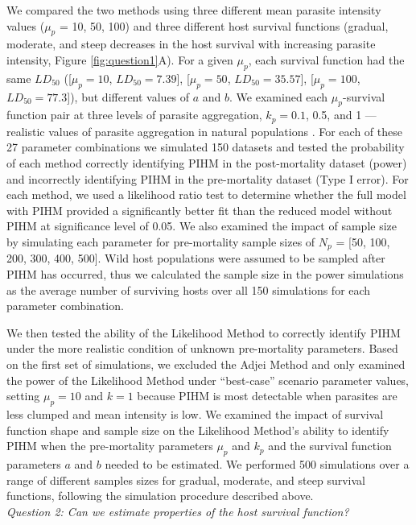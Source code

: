 \documentclass[12pt, a4paper]{article}
\begin{document}
We compared the two methods using three different mean parasite intensity values ($\mu_p$ = 10, 50, 100) and three different host survival functions (gradual, moderate, and steep decreases in the host survival with increasing parasite intensity, Figure \ref{fig:question1}A). For a given $\mu_p$, each survival function had the same $LD_{50}$ ([$\mu_p = 10$, $LD_{50} = 7.39$], [$\mu_p = 50$, $LD_{50} = 35.57$], [$\mu_p = 100$, $LD_{50}= 77.3$]),  but different values of $a$ and $b$.  We examined each $\mu_p$-survival function pair at  three levels of parasite
aggregation, $k_p = 0.1$, 0.5, and 1 --- realistic values of parasite aggregation in natural populations \citep{Shaw1998}.  For each of these 27 parameter
combinations we simulated 150 datasets and tested the probability of each method correctly identifying PIHM in the post-mortality dataset (power) and incorrectly identifying PIHM in the pre-mortality dataset (Type I error).  For each method, we used a likelihood ratio test to determine whether the full model with PIHM provided a significantly better fit than the reduced model without PIHM at significance level of 0.05.  We also examined the impact of sample size by simulating each parameter for pre-mortality sample sizes of $N_p$ = [50, 100, 200, 300, 400, 500].  Wild host populations were assumed to be sampled after PIHM has occurred, thus we calculated the sample size in the power simulations as the average number of surviving hosts over all 150 simulations for each parameter combination.

We then tested the ability of the Likelihood Method to correctly identify PIHM
under the more realistic condition of unknown pre-mortality parameters. Based
on the first set of simulations, we excluded the Adjei Method and only examined
the power of the Likelihood Method under ``best-case'' scenario parameter
values, setting $\mu_p = 10$ and $k = 1$ because PIHM is most detectable when
parasites are less clumped and mean intensity is low. We examined the impact of survival function shape and
sample size on the Likelihood Method's ability to identify PIHM when the pre-mortality parameters $\mu_p$ and $k_p$ and the survival function parameters $a$
and $b$ needed to be estimated.  We performed 500 simulations over a range of
different samples sizes for gradual, moderate, and steep survival functions, following the simulation procedure described above. \\

\noindent
\emph{Question 2: Can we estimate properties of the host survival function?}
\end{document}
